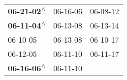 \begin{supertabular}{lll}
 \textbf{06-21-02\textsuperscript{$\wedge$}} &  06-16-06\textsuperscript{} &  06-08-12\textsuperscript{} \\
 \textbf{06-11-04\textsuperscript{$\wedge$}} &  06-13-08\textsuperscript{} &  06-13-14\textsuperscript{} \\
                  06-10-05\textsuperscript{} &  06-13-08\textsuperscript{} &  06-10-17\textsuperscript{} \\
                  06-12-05\textsuperscript{} &  06-11-10\textsuperscript{} &  06-11-17\textsuperscript{} \\
 \textbf{06-16-06\textsuperscript{$\wedge$}} &  06-11-10\textsuperscript{} &                             \\
\end{supertabular}

